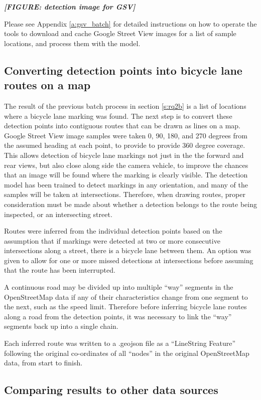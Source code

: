 \documentclass[11pt,twoside]{report}
\newcommand{\remark}[1]{{\bf \em [\marginpar{$\Leftarrow$}#1]}}
\begin{document}
\remark{FIGURE: detection image for GSV}

Please see Appendix \ref{a:gsv_batch} for detailed instructions on how to operate the tools to download and cache Google Street View images for a list of sample locations, and process them with the model.

\subsection{Converting detection points into bicycle lane routes on a map}
\label{s:rq2c}

The result of the previous batch process in section \ref{s:rq2b} is a list of locations where a bicycle lane marking was found.  The next step is to convert these detection points into contiguous routes that can be drawn as lines on a map.  Google Street View image samples were taken 0, 90, 180, and 270 degrees from the assumed heading at each point, to provide to provide 360 degree coverage.  This allows detection of bicycle lane markings not just in the the forward and rear views, but also close along side the camera vehicle, to improve the chances that an image will be found where the marking is clearly visible.  The detection model has been trained to detect markings in any orientation, and many of the samples will be taken at intersections.  Therefore, when drawing routes, proper consideration must be made about whether a detection belongs to the route being inspected, or an intersecting street.

Routes were inferred from the individual detection points based on the assumption that if markings were detected at two or more consecutive intersections along a street, there is a bicycle lane between them.  An option was given to allow for one or more missed detections at intersections before assuming that the route has been interrupted.

A continuous road may be divided up into multiple ``way'' segments in the OpenStreetMap data if any of their characteristics change from one segment to the next, such as the speed limit.  Therefore before inferring bicycle lane routes along a road from the detection points, it was necessary to link the ``way'' segments back up into a single chain.

Each inferred route was written to a .geojson file as a ``LineString Feature'' following the original co-ordinates of all ``nodes'' in the original OpenStreetMap data, from start to finish.

\subsection{Comparing results to other data sources}
\end{document}
